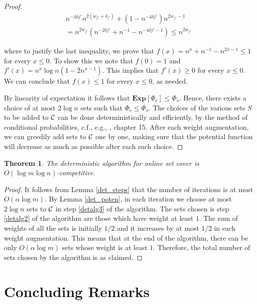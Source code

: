 \documentclass{sig-alternate}
\newtheorem{theorem}{Theorem}\newtheorem{prop}[theorem]{Proposition}
\def \CC   {{\cal C}}
\begin{document}
\begin{proof}
\begin{eqnarray*}
n^{-4\delta{j'}}n^{2(w_{j'}+\delta_{j'})}+(1-n^{-4\delta{j'}})n^{2w_{j'}-1}\\
=n^{2w_{j'}} ( n^{-2\delta{j'}} + n^{-1} - n^{-4\delta{j'}-1} )
\leq n^{2w_{j'}}
\end{eqnarray*}

where to justify the last inequality, we prove that $f(x)=n^x +
n^{-1} - n^{2x-1} \leq 1$ for every $x \leq 0$. To show this we
note that $f(0)=1$ and $f'(x)= n^x \log n (1 - 2n^{x-1})$. This
implies that $f'(x) \geq 0$ for every $x \leq 0$. We can conclude
that $f(x) \leq 1$ for every $x \leq 0$, as needed.

By linearity of expectation it follows that $\textbf{Exp}[\Phi_e]
\leq \Phi_s$. Hence, there exists a choice of at most $2 \log n$
sets such that $\Phi_e \leq \Phi_s$. The choices of the various
sets $S$ to be added to $\CC$ can be done deterministically and
efficiently, by the method of conditional probabilities, c.f.,
e.g., \cite{AS00}, chapter 15. After each weight augmentation, we
can greedily add sets to $\CC$ one by one, making sure that the
potential function will decrease as much as possible after each
such choice.
\end{proof}

\begin{theorem}\label{det_comp}
The deterministic algorithm for online set cover is $O(\log m \log
n)$-competitive.
\end{theorem}

\begin{proof}
It follows from Lemma \ref{det_steps} that the number of
iterations is at most $O(\alpha \log m)$. By Lemma
\ref{det_poten}, in each iteration we choose at most $2 \log n$
sets to $\CC$ in step \ref{detalg3} of the algorithm. The sets
chosen is step \ref{detalg2} of the algorithm are those which have
weight at least $1$. The sum of weights of all the sets is
initially $1/2$ and it increases by at most $1/2$ in each weight
augmentation. This means that at the end of the algorithm, there
can be only $O(\alpha \log m)$ sets whose weight is at least $1$.
Therefore, the total number of sets chosen by the algorithm is as
claimed.
\end{proof}

\section{Concluding Remarks}\label{sec:conclude}
\end{document}
